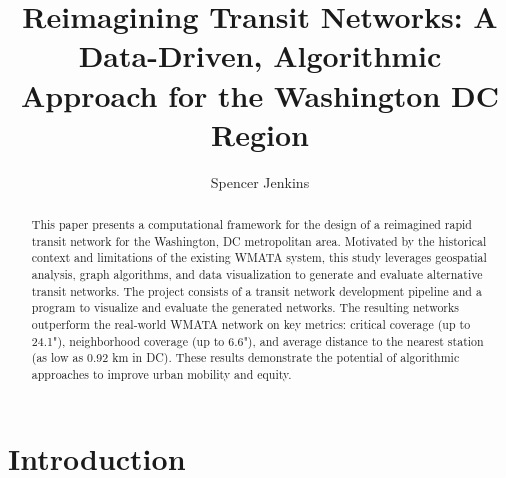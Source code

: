 \documentclass[sigconf,nonacm]{acmart}
\begin{document}
\title{Reimagining Transit Networks: A Data-Driven, Algorithmic Approach for the Washington DC Region}

\author{Spencer Jenkins}

\renewcommand{\shortauthors}{S. Jenkins}

\begin{abstract}
This paper presents a computational framework for the design of a reimagined rapid transit network for the Washington, DC metropolitan area. Motivated by the historical context and limitations of the existing WMATA system, this study leverages geospatial analysis, graph algorithms, and data visualization to generate and evaluate alternative transit networks. The project consists of a transit network development pipeline and a program to visualize and evaluate the generated networks. The resulting networks outperform the real-world WMATA network on key metrics: critical coverage (up to 24.1"), neighborhood coverage (up to 6.6"), and average distance to the nearest station (as low as 0.92 km in DC). These results demonstrate the potential of algorithmic approaches to improve urban mobility and equity.
\end{abstract}

\maketitle



\section{Introduction}
\end{document}
